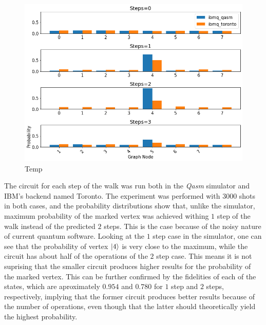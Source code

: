 \documentclass[../../dissertation.tex]{subfiles}
\begin{document}
\begin{figure}[!h]
	\centering
	\includegraphics[scale=0.40]{img/Qiskit/StaggeredQW/Search/stagSearchToronto_N3_S0123.png}
	\caption{Temp}
	\label{fig:stagSearchResultsToronto}
\end{figure}
The circuit for each step of the walk was run both in the \textit{Qasm}
simulator and IBM's backend named Toronto. The experiment was performed with
$3000$ shots in both cases, and the probability distributions show that,
unlike the simulator, maximum probability of the marked vertex was achieved
withing $1$ step of the walk instead of the predicted $2$ steps. This is the
case because of the noisy nature of current quantum software. Looking at the
$1$ step case in the simulator, one can see that the probability of vertex
$\ket{4}$ is very close to the maximum, while the circuit has about half of the
operations of the $2$ step case. This means it is not suprising that the
smaller circuit produces higher results for the probability of the marked
vertex. 
This can be further confirmed by the fidelities of each of the states,
which are aproximately $0.954$ and $0.780$ for $1$ step and $2$ steps,
respectively, implying that the former circuit produces better results because
of the number of operations, even though that the latter should theoretically
yield the highest probability. 
\end{document}
